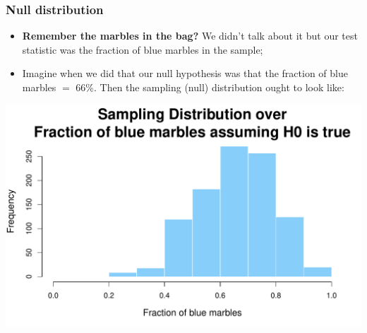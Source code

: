 \documentclass[aspectratio=169]{beamer}
\theoremstyle{principle}
\begin{document}
\begin{frame}
\frametitle{Null distribution}
  
\begin{itemize}
\item \textbf{Remember the marbles in the bag?}  We didn't talk about it but our test statistic was the fraction of blue marbles in the sample;
\bigskip

\item Imagine when we did that our null hypothesis was that the fraction of blue marbles $=$ 66\%.  Then the sampling (null) distribution ought to look like:
\end{itemize}

\begin{center}
\includegraphics[scale=0.4]{null_66.pdf}
\end{center}

\end{frame}
\end{document}
